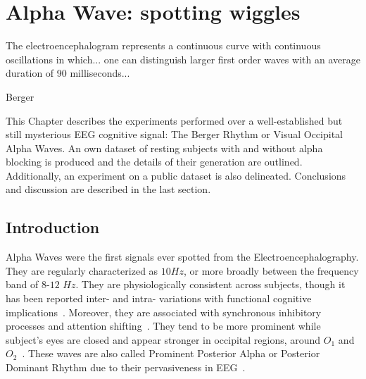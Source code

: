 \chapter{Alpha Wave: spotting wiggles}
\label{chapter:four}
\epigraph{The electroencephalogram represents a continuous curve with continuous oscillations in which... one can distinguish larger first order waves with an average duration of 90 milliseconds...}{Berger}

This Chapter describes the experiments performed over a well-established but still mysterious EEG cognitive signal: The Berger Rhythm or Visual Occipital Alpha Waves.  An own dataset of resting subjects with and without alpha blocking is produced and the details of their generation are outlined.  Additionally, an experiment on a public dataset is also delineated.  Conclusions and discussion are described in the last section.

\section{Introduction}


Alpha Waves were the first signals ever spotted from the Electroencephalography.  They are regularly characterized as $10\si{Hz}$, or more broadly between the frequency band of $8$-$12$ $\si{Hz}$. They are physiologically consistent across subjects, though it has been reported inter- and intra- variations with functional cognitive implications~\cite{Haegens2014}.   Moreover, they are associated with synchronous inhibitory processes and attention shifting~\cite{Sanei2007}. They tend to be more prominent while subject's eyes are closed and appear stronger in occipital regions, around $O_1$ and $O_2$~\cite{WolpawJonathanR2012,Stopczynski2014}. These waves are also called Prominent Posterior Alpha or Posterior Dominant Rhythm due to their pervasiveness in EEG~\cite{Schomer2010,Haegens2014}.

